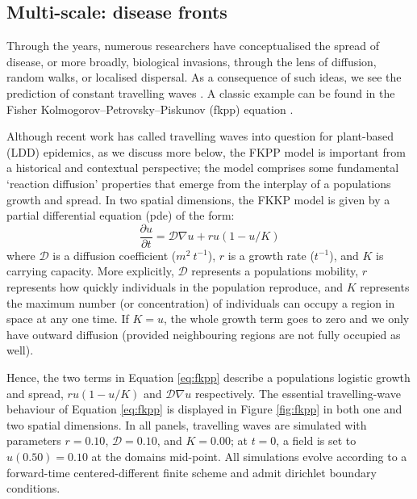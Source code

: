\subsection{Multi-scale: disease fronts}

Through the years, numerous researchers have conceptualised the spread of disease, or more broadly, biological invasions, 
through the lens of diffusion, random walks, or localised dispersal. As a consequence of such ideas, we see the prediction
of constant travelling waves \cite{skellam1951random, mollison1977spatial, GRASSBERGER1983157, ferrandino1993dispersive}.
A classic example can be found in the Fisher Kolmogorov–Petrovsky–Piskunov (\acrshort{fkpp}) equation \cite{fisher1937wave}.

Although recent work has called travelling waves into question for plant-based (LDD) epidemics, as we discuss more below, 
the FKPP model is important from a historical and contextual perspective;
the model comprises some fundamental `reaction diffusion' properties that emerge from the interplay of a populations growth and spread.
In two spatial dimensions, the FKKP model is given by a partial differential equation (\acrshort{pde}) of the form:
\begin{equation}
\label{eq:fkpp}
    \frac{\partial u}{\partial t} = \mathcal{D}\nabla u + ru(1 - u/K)
\end{equation}
where $\mathcal{D}$ is a diffusion coefficient ($m^2\ t^{-1}$), $r$ is a growth rate ($t^{-1}$),
and $K$ is carrying capacity. More explicitly, $\mathcal{D}$ represents a populations mobility, 
$r$ represents how quickly individuals in the population reproduce, and $K$ represents 
the maximum number (or concentration) of individuals can occupy a region in space at any one time.
If $K=u$, the whole growth term goes to zero and we only have outward diffusion (provided neighbouring
regions are not fully occupied as well). 

Hence, the two terms in Equation \ref{eq:fkpp} describe a populations logistic growth and spread, $ru(1 - u/K)$ and $\mathcal{D}\nabla u$ respectively.
The essential travelling-wave behaviour of Equation \ref{eq:fkpp} is displayed in Figure \ref{fig:fkpp} 
in both one and two spatial dimensions. In all panels, travelling waves are simulated 
with parameters $r=0.10$, $\mathcal{D}=0.10$, and $K=0.00$; at $t=0$, a field is set to $u(0.50)=0.10$ at the domains mid-point.
All simulations evolve according to a forward-time centered-different finite scheme and admit dirichlet boundary conditions.

